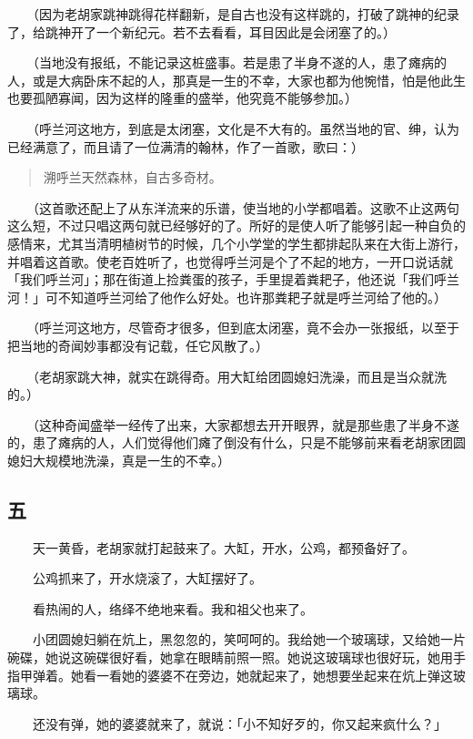 \documentclass[UTF8]{ctexart}
\begin{document}
　　（因为老胡家跳神跳得花样翻新，是自古也没有这样跳的，打破了跳神的纪录了，给跳神开了一个新纪元。若不去看看，耳目因此是会闭塞了的。）

　　（当地没有报纸，不能记录这桩盛事。若是患了半身不遂的人，患了瘫病的人，或是大病卧床不起的人，那真是一生的不幸，大家也都为他惋惜，怕是他此生也要孤陋寡闻，因为这样的隆重的盛举，他究竟不能够参加。）

　　（呼兰河这地方，到底是太闭塞，文化是不大有的。虽然当地的官、绅，认为已经满意了，而且请了一位满清的翰林，作了一首歌，歌曰：）

\begin{verse}
    溯呼兰天然森林，自古多奇材。
\end{verse}

　　（这首歌还配上了从东洋流来的乐谱，使当地的小学都唱着。这歌不止这两句这么短，不过只唱这两句就已经够好的了。所好的是使人听了能够引起一种自负的感情来，尤其当清明植树节的时候，几个小学堂的学生都排起队来在大街上游行，并唱着这首歌。使老百姓听了，也觉得呼兰河是个了不起的地方，一开口说话就「我们呼兰河」；那在街道上捡粪蛋的孩子，手里提着粪耙子，他还说「我们呼兰河！」可不知道呼兰河给了他作么好处。也许那粪耙子就是呼兰河给了他的。）

　　（呼兰河这地方，尽管奇才很多，但到底太闭塞，竟不会办一张报纸，以至于把当地的奇闻妙事都没有记载，任它风散了。）

　　（老胡家跳大神，就实在跳得奇。用大缸给团圆媳妇洗澡，而且是当众就洗的。）

　　（这种奇闻盛举一经传了出来，大家都想去开开眼界，就是那些患了半身不遂的，患了瘫病的人，人们觉得他们瘫了倒没有什么，只是不能够前来看老胡家团圆媳妇大规模地洗澡，真是一生的不幸。）

\subsection{五}

　　天一黄昏，老胡家就打起鼓来了。大缸，开水，公鸡，都预备好了。

　　公鸡抓来了，开水烧滚了，大缸摆好了。

　　看热闹的人，络绎不绝地来看。我和祖父也来了。

　　小团圆媳妇躺在炕上，黑忽忽的，笑呵呵的。我给她一个玻璃球，又给她一片碗碟，她说这碗碟很好看，她拿在眼睛前照一照。她说这玻璃球也很好玩，她用手指甲弹着。她看一看她的婆婆不在旁边，她就起来了，她想要坐起来在炕上弹这玻璃球。

　　还没有弹，她的婆婆就来了，就说：「小不知好歹的，你又起来疯什么？」
\end{document}
